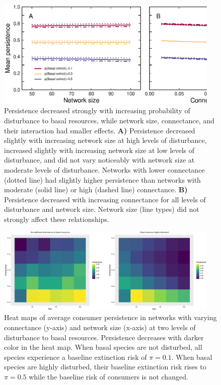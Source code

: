 \documentclass[12pt]{article}
\begin{document}
\begin{spacing}{2.0}
    \begin{figure}[h!]
        \centering
        \includegraphics[width=0.95\textwidth]{figures/persistence_vs_SC_lm.eps}
        \caption{Persistence decreased strongly with increasing probability of disturbance to basal resources, while network size, connectance, and their interaction had smaller effects. \textbf{A)} Persistence decreased slightly with increasing network size at high levels of disturbance, increased slightly with increasing network size at low levels of disturbance, and did not vary noticeably with network size at moderate levels of disturbance. Networks with lower connectance (dotted line) had slightly higher persistence than networks with moderate (solid line) or high (dashed line) connectance.
        \textbf{B)} Persistence decreased with increasing connectance for all levels of disturbance and network size. Network size (line types) did not strongly affect these relationships.}
        \label{fig:lm_CS}
    \end{figure}



    \begin{figure}[h!]
      \includegraphics[width=0.95\textwidth]{figures/heatmap_CS_BPcompare.eps}
       \caption{Heat maps of average consumer persistence in networks with varying connectance (y-axis) and network size (x-axis) at two levels of disturbance to basal resources. Persistence decreases with darker color in the heat map. When basal species are not disturbed, all species experience a baseline extinction risk of $\pi = 0.1$. When basal species are highly disturbed, their baseline extinction risk rises to $\pi = 0.5$ while the baseline risk of consumers is not changed.}
       \label{fig:heatmap_CS}
    \end{figure}



\end{spacing}
\end{document}

